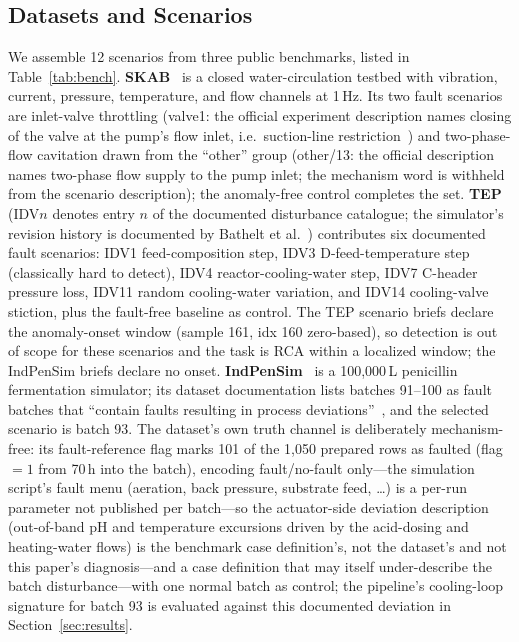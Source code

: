 \documentclass[preprint,10pt]{elsarticle}
\begin{document}
\subsection{Datasets and Scenarios}
We assemble 12 scenarios from three public benchmarks, listed in Table~\ref{tab:bench}. \textbf{SKAB}~\cite{skab2020} is a closed water-circulation testbed with vibration, current, pressure, temperature, and flow channels at 1\,Hz. Its two fault scenarios are inlet-valve throttling (valve1: the official experiment description names closing of the valve at the pump's flow inlet, i.e.\ suction-line restriction~\cite{skab2020}) and two-phase-flow cavitation drawn from the ``other'' group (other/13: the official description names two-phase flow supply to the pump inlet; the mechanism word is withheld from the scenario description); the anomaly-free control completes the set. \textbf{TEP}~\cite{downs1993plant,lyman1995plant,rieth2017additional} (IDV$n$ denotes entry $n$ of the documented disturbance catalogue; the simulator's revision history is documented by Bathelt et al.~\cite{bathelt2015revision}) contributes six documented fault scenarios: IDV1 feed-composition step, IDV3 D-feed-temperature step (classically hard to detect), IDV4 reactor-cooling-water step, IDV7 C-header pressure loss, IDV11 random cooling-water variation, and IDV14 cooling-valve stiction, plus the fault-free baseline as control. The TEP scenario briefs declare the anomaly-onset window (sample 161, idx 160 zero-based), so detection is out of scope for these scenarios and the task is RCA within a localized window; the IndPenSim briefs declare no onset. \textbf{IndPenSim}~\cite{goldrick2015development,goldrick2019modern} is a 100{,}000\,L penicillin fermentation simulator; its dataset documentation lists batches 91--100 as fault batches that ``contain faults resulting in process deviations''~\cite{goldrick2019modern}, and the selected scenario is batch 93. The dataset's own truth channel is deliberately mechanism-free: its fault-reference flag marks 101 of the 1,050 prepared rows as faulted (flag $=1$ from 70\,h into the batch), encoding fault/no-fault only---the simulation script's fault menu (aeration, back pressure, substrate feed, \dots) is a per-run parameter not published per batch---so the actuator-side deviation description (out-of-band pH and temperature excursions driven by the acid-dosing and heating-water flows) is the benchmark case definition's, not the dataset's and not this paper's diagnosis---and a case definition that may itself under-describe the batch disturbance---with one normal batch as control; the pipeline's cooling-loop signature for batch 93 is evaluated against this documented deviation in Section~\ref{sec:results}. 
\end{document}
